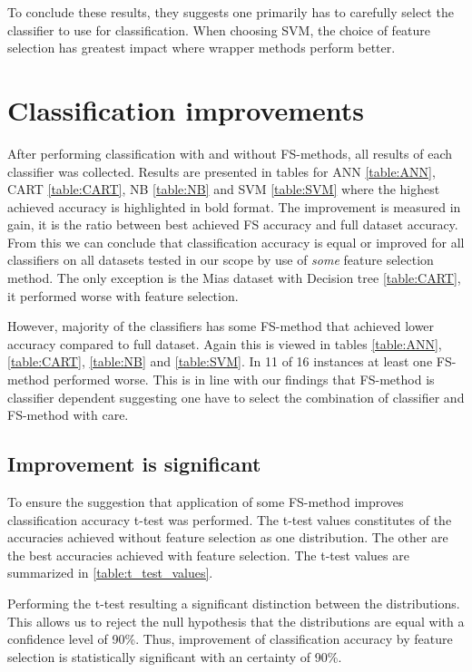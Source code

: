 To conclude these results, they suggests one primarily has to carefully select the classifier to use for classification. When choosing SVM, the choice of feature selection has greatest impact where wrapper methods perform better.


\section{Classification improvements}

After performing classification with and without FS-methods, all results of each classifier was collected. Results are presented in tables for ANN \ref{table:ANN}, CART \ref{table:CART}, NB \ref{table:NB} and SVM \ref{table:SVM} where the highest achieved accuracy is highlighted in bold format. The improvement is measured in gain, it is the ratio between best achieved FS accuracy and full dataset accuracy. From this we can conclude that classification accuracy is equal or improved for all classifiers on all datasets tested in our scope by use of \textit{some} feature selection method. The only exception is the Mias dataset with Decision tree \ref{table:CART}, it performed worse with feature selection.

However, majority of the classifiers has some FS-method that achieved lower accuracy compared to full dataset. Again this is viewed in tables \ref{table:ANN}, \ref{table:CART}, \ref{table:NB} and \ref{table:SVM}. In 11 of 16 instances at least one FS-method performed worse. This is in line with our findings that FS-method is classifier dependent suggesting one have to select the combination of classifier and FS-method with care.



\subsection{Improvement is significant}

To ensure the suggestion that application of some FS-method improves classification accuracy t-test was performed. The t-test values constitutes of the accuracies achieved without feature selection as one distribution. The other are the best accuracies achieved with feature selection. The t-test values are summarized in \ref{table:t_test_values}.




Performing the t-test resulting a significant distinction between the distributions. This allows us to reject the null hypothesis that the distributions are equal with a confidence level of 90\%. Thus, improvement of classification accuracy by feature selection is statistically significant with an certainty of 90\%.

